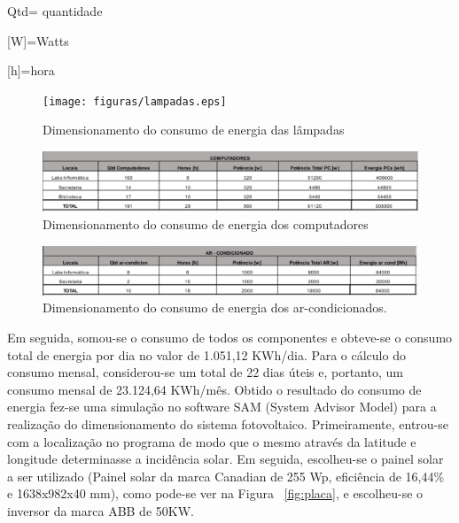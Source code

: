\centerline{Qtd= quantidade}
\centerline{[W]=Watts}
\centerline{[h]=hora}

\begin{figure}[!h]
  \centering
  \texttt{[image: figuras/lampadas.eps]}
  \caption{Dimensionamento do consumo de energia das lâmpadas}
  \label{fig:lampadas}
\end{figure}

\begin{figure}[!h]
  \centering
  \includegraphics[keepaspectratio=true,scale=0.3]{figuras/computadores.eps}
  \caption{Dimensionamento do consumo de energia dos computadores}
  \label{fig:computadores}
\end{figure}

\begin{figure}[!h]
  \centering
  \includegraphics[keepaspectratio=true,scale=0.3]{figuras/ar_condicionados.eps}
  \caption{Dimensionamento do consumo de energia dos ar-condicionados.}
  \label{fig:ar_condicionados}
\end{figure}

Em seguida, somou-se o consumo de todos os componentes e obteve-se o consumo total de energia por dia no valor de 1.051,12 KWh/dia. Para o cálculo do consumo mensal, considerou-se um total de 22 dias úteis  e, portanto, um consumo mensal de 23.124,64 KWh/mês.
Obtido o resultado do consumo de energia fez-se uma simulação no software SAM (System Advisor Model) para a realização do dimensionamento do sistema fotovoltaico. Primeiramente, entrou-se com a localização no programa de modo que o mesmo através da latitude e longitude determinasse a incidência solar. Em seguida, escolheu-se o painel solar a ser utilizado (Painel solar da marca Canadian de 255 Wp, eficiência de 16,44\% e 1638x982x40 mm), como pode-se ver na Figura ~\ref{fig:placa}, e escolheu-se o inversor da marca ABB de 50KW.

